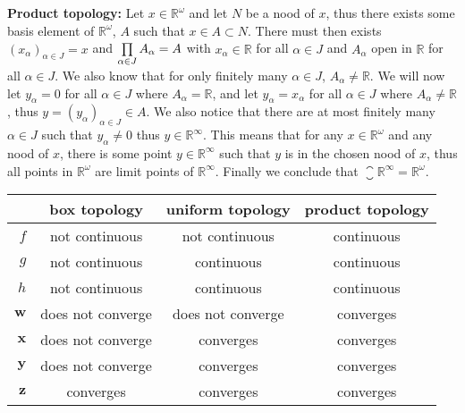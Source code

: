 \documentclass{article}
\begin{document}
\textbf{Product topology:} Let $x \in\mathbb R^\omega$ and let $N$ be a nood of $x$, thus there exists some basis element of $\mathbb R^\omega$, $A$ such that $x \in A \subset N$. There must then exists $(x_\alpha)_{\alpha\in J} = x$ and $\prod\limits_{\alpha \in J}^{} {A_\alpha}  = A$ with $x_\alpha \in \mathbb R$ for all $\alpha \in J$ and $A_\alpha$ open in $\mathbb R$ for all $\alpha \in J$. We also know that for only finitely many $\alpha\in J$, $A_\alpha \not= \mathbb R$. We will now let $y_\alpha = 0$ for all $\alpha \in J$ where $A_\alpha=\mathbb R$, and let $y_\alpha = x_\alpha$ for all $\alpha\in J$ where $A_\alpha\not= \mathbb R$, thus $y = (y_\alpha)_{\alpha\in J} \in A$. We also notice that there are at most finitely many $\alpha \in J$ such that $y_\alpha\not=0$ thus $y \in \mathbb R^\infty$. This means that for any $x\in\mathbb R^\omega$ and any nood of $x$, there is some point $y\in\mathbb R^\infty$ such that $y$ is in the chosen nood of $x$, thus all points in $\mathbb R^\omega$ are limit points of $\mathbb R^\infty$. Finally we conclude that $\closure{\mathbb R^\infty} = \mathbb R^\omega$.

\bigskip


\begin{center}
	\begin{tabular}{r|c c c}
		&box topology&uniform topology &product topology\\
		\hline\question{(a)}
		$f$&not continuous&not continuous&continuous \\
		$g$&not continuous&continuous&continuous\\
		$h$&not continuous&continuous&continuous\\
		\hline\question{(b)}
		$\mathbf w$&does not converge&does not converge&converges\\
		$\mathbf x$&does not converge&converges&converges\\
		$\mathbf y$&does not converge&converges&converges\\
		$\mathbf z$&converges&converges&converges
	\end{tabular}
\end{center}
\end{document}
